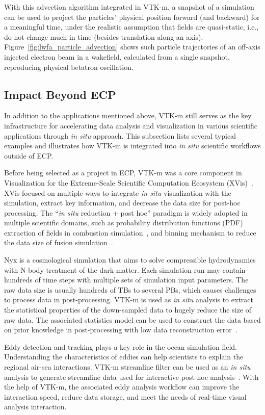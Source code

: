 With this advection algorithm integrated in VTK-m, a snapshot of a simulation can be used to project the particles' physical position forward (and backward) for a meaningful time, under the realistic assumption that fields are quasi-static, i.e., do not change much in time (besides translation along an axis).
Figure~\ref{fig:lwfa_particle_advection} shows such particle trajectories of an off-axis injected electron beam in a wakefield, calculated from a single snapshot, reproducing physical betatron oscillation.

\subsection{Impact Beyond ECP}


In addition to the applications mentioned above, VTK-m still serves as the key infrastructure for accelerating data analysis and visualization in various scientific applications through \emph{in situ} approach. This subsection lists several typical examples and illustrates how VTK-m is integrated into \emph{in situ} scientific workflows outside of ECP.


Before being selected as a project in ECP, VTK-m was a core component in Visualization for the Extreme-Scale Scientific Computation Ecosystem (XVis)~\cite{Moreland2019}. 
XVis focused on multiple ways to integrate \emph{in situ} visualization with the simulation, extract key information, and decrease the data size for post-hoc processing.
The ``\emph{in situ} reduction + post hoc'' paradigm is widely adopted in multiple scientific domains, such as probability distribution functions (PDF) extraction of fields in combustion simulation~\cite{7874311}, and binning mechanism to reduce the data size of fusion simulation~\cite{Kress2018}. 


Nyx is a cosmological simulation that aims to solve compressible hydrodynamics with N-body treatment of the dark matter. Each simulation run may contain hundreds of time steps with multiple sets of simulation input parameters. The raw data size is usually hundreds of TBs to several PBs, which causes challenges to process data in post-processing. 
VTK-m is used as \emph{in situ} analysis to extract the statistical properties of the down-sampled data to hugely reduce the size of raw data. The associated statistics model can be used to construct the data based on prior knowledge in post-processing with low data reconstruction error~\cite{Wang2019}.

Eddy detection and tracking plays a key role in the ocean simulation field. Understanding the characteristics of eddies can help scientists to explain the regional air-sea interactions.
VTK-m streamline filter can be used as an \emph{in situ} analysis to generate streamline data used for interactive post-hoc analysis~\cite{Han2022}. With the help of VTK-m, the associated eddy analysis workflow can improve the interaction speed, reduce data storage, and meet the
needs of real-time visual analysis interaction.  
